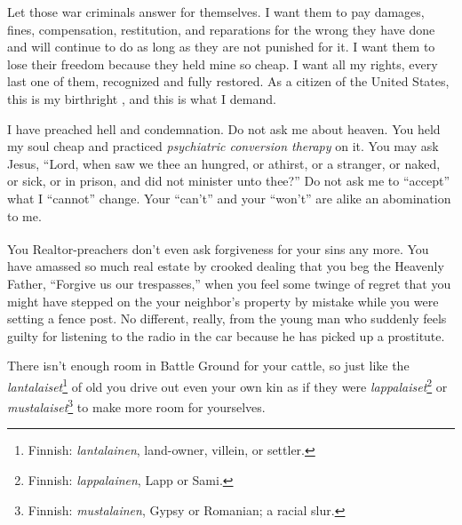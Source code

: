 \documentclass[letterpaper]{article}
\begin{document}
Let those war criminals answer for themselves.  I want them to pay damages, fines, compensation, restitution, and reparations for the wrong they have done and will continue to do as long as they are not punished for it.  I want them to lose their freedom because they held mine so cheap.  I want all my rights, every last one of them, recognized and fully restored.  As a citizen of the United States, this is my birthright \cite{found}, and this is what I demand.

I have preached hell and condemnation.  Do not ask me about heaven.  You held my soul cheap and practiced \textit{psychiatric conversion therapy} on it.  You may ask Jesus, ``Lord, when saw we thee an hungred, or athirst, or a stranger, or naked, or sick, or in prison, and did not minister unto thee?''  Do not ask me to ``accept'' what I ``cannot'' change.  Your ``can't'' and your ``won't'' are alike an abomination to me.

You Realtor\textsuperscript\textregistered-preachers don't even ask forgiveness for your sins any more.  You have amassed so much real estate by crooked dealing that you beg the Heavenly Father, ``Forgive us our trespasses,'' when you feel some twinge of regret that you might have stepped on the your neighbor's property by mistake while you were setting a fence post.  No different, really, from the young man who suddenly feels guilty for listening to the radio in the car because he has picked up a prostitute.

There isn't enough room in Battle Ground for your cattle, so just like the \foreignlanguage{finnish}{\textit{lantalaiset}}\footnote{Finnish: \foreignlanguage{finnish}{\textit{lantalainen}}, land-owner, villein, or settler.} of old you drive out even your own kin as if they were \foreignlanguage{finnish}{\textit{lappalaiset}}\footnote{Finnish: \foreignlanguage{finnish}{\textit{lappalainen}}, Lapp or Sami.} or \foreignlanguage{finnish}{\textit{mustalaiset}}\footnote{Finnish: \foreignlanguage{finnish}{\textit{mustalainen}}, Gypsy or Romanian; a racial slur.} to make more room for yourselves.
\end{document}
